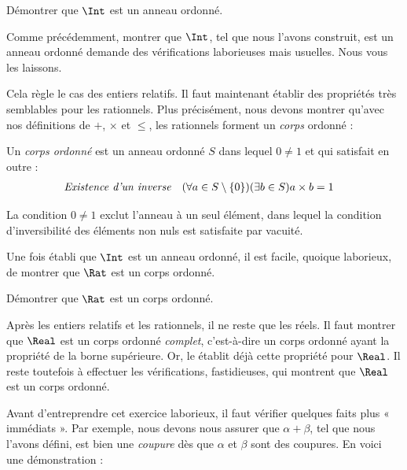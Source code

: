 \documentclass[../../../include/open-logic-section]{subfiles}
\begin{document}
\begin{prob}
Démontrer que $\Int$ est un anneau ordonné.
\end{prob}

Comme précédemment, montrer que $\Int$, tel que nous l'avons construit,
est un anneau ordonné demande des vérifications laborieuses mais
usuelles. Nous vous les laissons.

Cela règle le cas des entiers relatifs. Il faut maintenant établir des
propriétés très semblables pour les rationnels. Plus précisément, nous
devons montrer qu'avec nos définitions de $+$, $\times$ et $\leq$, les
rationnels forment un \emph{corps} ordonné :
\begin{defn}
Un \emph{corps ordonné} est un anneau ordonné $S$ dans lequel
$0\neq1$ et qui satisfait en outre :
\begin{align*}
  \emph{Existence d'un inverse}& &
  (\forall a \in S \setminus \{0\})(\exists b \in S) a\times b& = 1
\end{align*}
\end{defn}
La condition $0\neq1$ exclut l’anneau à un seul élément, dans
lequel la condition d’inversibilité des éléments non nuls est
satisfaite par vacuité.
%
%

Une fois établi que $\Int$ est un anneau ordonné, il est facile, quoique
laborieux, de montrer que $\Rat$ est un corps ordonné.

\begin{prob}
Démontrer que $\Rat$ est un corps ordonné.
\end{prob}

Après les entiers relatifs et les rationnels, il ne reste que les réels.
Il faut montrer que $\Real$ est un corps ordonné \emph{complet},
c'est-à-dire un corps ordonné ayant la propriété de la borne supérieure.
Or, le  établit déjà cette propriété pour
$\Real$. Il reste toutefois à effectuer les vérifications, fastidieuses,
qui montrent que $\Real$ est un corps ordonné.

Avant d'entreprendre cet exercice laborieux, il faut vérifier quelques
faits plus « immédiats ». Par exemple, nous devons nous assurer que
$\alpha + \beta$, tel que nous l'avons défini, est bien une
\emph{coupure} dès que $\alpha$ et $\beta$ sont des coupures.
En voici une démonstration :
\end{document}
